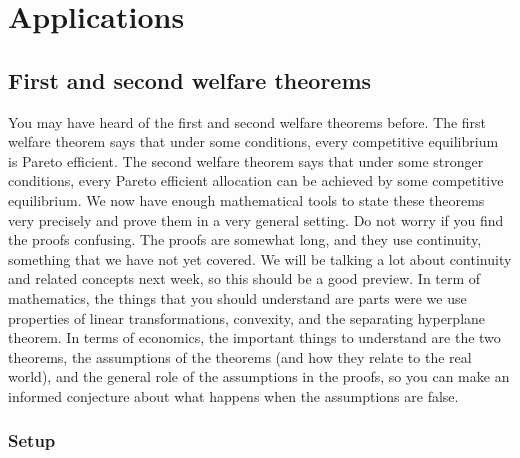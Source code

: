 \documentclass[12pt,reqno]{amsart}
\theoremstyle{definition}
\begin{document}
\section{Applications}

\subsection{First and second welfare theorems}

You may have heard of the first and second welfare theorems
before. The first welfare theorem says that under some conditions,
every competitive equilibrium is Pareto efficient. The second welfare
theorem says that under some stronger conditions, every Pareto
efficient allocation can be achieved by some competitive
equilibrium. We now have enough mathematical tools to state these
theorems very precisely and prove them in a very general setting.  Do
not worry if you find the proofs confusing. The proofs are somewhat
long, and they use continuity, something that we have not yet
covered. We will be talking a lot about continuity and related
concepts next week, so this should be a good preview. In term of
mathematics, the things that you should understand are parts were we
use properties of linear transformations, convexity, and the
separating hyperplane theorem. In terms of economics, the important
things to understand are the two theorems, the assumptions of the
theorems (and how they relate to the real world), and the general role
of the assumptions in the proofs, so you can make an informed
conjecture about what happens when the assumptions are false.

\subsubsection{Setup}
\end{document}
